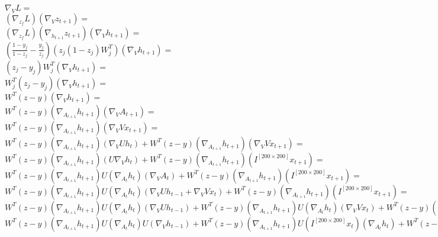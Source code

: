 \documentclass[landscape]{report}
\begin{document}
$\nabla_{V} L =$\\
$\left(\nabla_{z_f} L \right)\left( \nabla_{V} z_{t+1}\right) =$\\
$ \left(\nabla_{z_f} L \right) \left(\nabla_{h_{t+1}} z_{t+1}\right) \left( \nabla_{V} h_{t+1} \right) = $\\
$ \left( \frac{1-y_j}{1-z_j} - \frac{y_j}{z_j} \right)\left(z_j(1-z_j)W_j^T\right) \left( \nabla_{V} h_{t+1} \right) = $\\
$ \left( z_j - y_j \right)W_j^T \left( \nabla_{V} h_{t+1} \right) = $\\
$ W_j^T\left( z_j - y_j \right) \left( \nabla_{V} h_{t+1} \right) = $\\
$ W^T(z-y)\left( \nabla_{V} h_{t+1} \right) = $\\
$ W^T(z-y)\left( \nabla_{A_{t+1}} h_{t+1} \right)\left(\nabla_{V} A_{t+1}\right) =$\\
$ W^T(z-y)\left( \nabla_{A_{t+1}} h_{t+1} \right) \left(\nabla_{V} Vx_{t+1}\right) =$\\
$ W^T(z-y)\left( \nabla_{A_{t+1}} h_{t+1} \right) \left(\nabla_{V} U h_t \right) + W^T(z-y)\left( \nabla_{A_{t+1}} h_{t+1} \right) \left(\nabla_{V} Vx_{t+1}\right) = $\\
$ W^T(z-y)\left( \nabla_{A_{t+1}} h_{t+1} \right) \left(U \nabla_{V} h_t \right) + W^T(z-y)\left( \nabla_{A_{t+1}} h_{t+1} \right) \left(I^{[200\times200]} x_{t+1}\right) = $\\

$ W^T(z-y)\left( \nabla_{A_{t+1}} h_{t+1} \right) U \left( \nabla_{A_{t}} h_{t} \right)\left(\nabla_{V} A_{t}\right) + W^T(z-y)\left( \nabla_{A_{t+1}} h_{t+1} \right) \left(I^{[200\times200]} x_{t+1}\right) = $\\
$ W^T(z-y)\left( \nabla_{A_{t+1}} h_{t+1} \right) U \left( \nabla_{A_{t}} h_{t} \right)\left(\nabla_{V} U h_{t-1} + \nabla_{V} Vx_{t}\right) + W^T(z-y)\left( \nabla_{A_{t+1}} h_{t+1} \right) \left(I^{[200\times200]} x_{t+1}\right) = $\\
$ W^T(z-y)\left( \nabla_{A_{t+1}} h_{t+1} \right) U \left( \nabla_{A_{t}} h_{t} \right)\left(\nabla_{V} U h_{t-1}\right) + W^T(z-y)\left( \nabla_{A_{t+1}} h_{t+1} \right) U \left( \nabla_{A_{t}} h_{t} \right)\left(\nabla_{V} Vx_{t}\right) + W^T(z-y)\left( \nabla_{A_{t+1}} h_{t+1} \right) \left(I^{[200\times200]} x_{t+1}\right) = $\\
$ W^T(z-y)\left( \nabla_{A_{t+1}} h_{t+1} \right) U \left( \nabla_{A_{t}} h_{t} \right) U \left(\nabla_{V} h_{t-1}\right) + W^T(z-y)\left( \nabla_{A_{t+1}} h_{t+1} \right) U \left(I^{[200\times200]} x_{t}\right)\left( \nabla_{A_{t}} h_{t} \right) + W^T(z-y) \left(I^{[200\times200]} x_{t+1}\right)\left( \nabla_{A_{t+1}} h_{t+1} \right) = $\\
\end{document}
